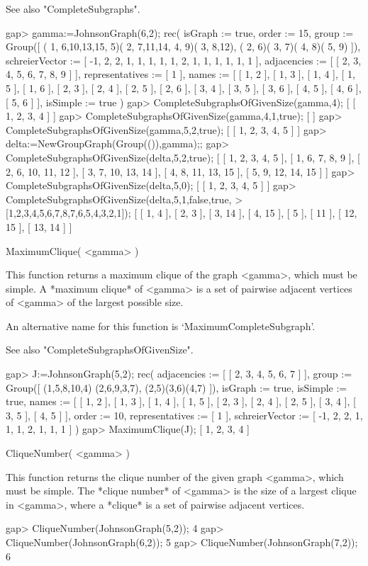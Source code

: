 See also "CompleteSubgraphs".

\beginexample
gap> gamma:=JohnsonGraph(6,2);                         
rec( isGraph := true, order := 15, 
  group := Group([ ( 1, 6,10,13,15, 5)( 2, 7,11,14, 4, 9)( 3, 8,12), 
      ( 2, 6)( 3, 7)( 4, 8)( 5, 9) ]), 
  schreierVector := [ -1, 2, 2, 1, 1, 1, 1, 1, 2, 1, 1, 1, 1, 1, 1 ], 
  adjacencies := [ [ 2, 3, 4, 5, 6, 7, 8, 9 ] ], representatives := [ 1 ], 
  names := [ [ 1, 2 ], [ 1, 3 ], [ 1, 4 ], [ 1, 5 ], [ 1, 6 ], [ 2, 3 ], 
      [ 2, 4 ], [ 2, 5 ], [ 2, 6 ], [ 3, 4 ], [ 3, 5 ], [ 3, 6 ], [ 4, 5 ], 
      [ 4, 6 ], [ 5, 6 ] ], isSimple := true )
gap> CompleteSubgraphsOfGivenSize(gamma,4);
[ [ 1, 2, 3, 4 ] ]
gap> CompleteSubgraphsOfGivenSize(gamma,4,1,true);
[  ]
gap> CompleteSubgraphsOfGivenSize(gamma,5,2,true);
[ [ 1, 2, 3, 4, 5 ] ]
gap> delta:=NewGroupGraph(Group(()),gamma);;
gap> CompleteSubgraphsOfGivenSize(delta,5,2,true);
[ [ 1, 2, 3, 4, 5 ], [ 1, 6, 7, 8, 9 ], [ 2, 6, 10, 11, 12 ], 
  [ 3, 7, 10, 13, 14 ], [ 4, 8, 11, 13, 15 ], [ 5, 9, 12, 14, 15 ] ]
gap> CompleteSubgraphsOfGivenSize(delta,5,0);
[ [ 1, 2, 3, 4, 5 ] ]
gap> CompleteSubgraphsOfGivenSize(delta,5,1,false,true,
>       [1,2,3,4,5,6,7,8,7,6,5,4,3,2,1]);
[ [ 1, 4 ], [ 2, 3 ], [ 3, 14 ], [ 4, 15 ], [ 5 ], [ 11 ], [ 12, 15 ], 
  [ 13, 14 ] ]
\endexample


\>MaximumClique( <gamma> )

This function returns a maximum clique of the graph <gamma>, which must
be simple.  A *maximum clique*
of <gamma> is a
set of pairwise adjacent vertices of <gamma> of the largest possible size.

An alternative name for this function is
`MaximumCompleteSubgraph'.

See also "CompleteSubgraphsOfGivenSize".

\beginexample
gap> J:=JohnsonGraph(5,2);
rec( adjacencies := [ [ 2, 3, 4, 5, 6, 7 ] ], group := Group([ (1,5,8,10,4)
  (2,6,9,3,7), (2,5)(3,6)(4,7) ]), isGraph := true, isSimple := true, 
  names := [ [ 1, 2 ], [ 1, 3 ], [ 1, 4 ], [ 1, 5 ], [ 2, 3 ], [ 2, 4 ], 
      [ 2, 5 ], [ 3, 4 ], [ 3, 5 ], [ 4, 5 ] ], order := 10, 
  representatives := [ 1 ], schreierVector := [ -1, 2, 2, 1, 1, 1, 2, 1, 1, 1 
     ] )
gap> MaximumClique(J);
[ 1, 2, 3, 4 ]
\endexample


\>CliqueNumber( <gamma> )

This function returns the clique number of the given graph <gamma>,
which must be simple.  The *clique number*
of <gamma> is the size of a largest clique in <gamma>, where a *clique*
is a set of pairwise adjacent vertices.

\beginexample
gap> CliqueNumber(JohnsonGraph(5,2));
4
gap> CliqueNumber(JohnsonGraph(6,2));
5
gap> CliqueNumber(JohnsonGraph(7,2));
6
\endexample
